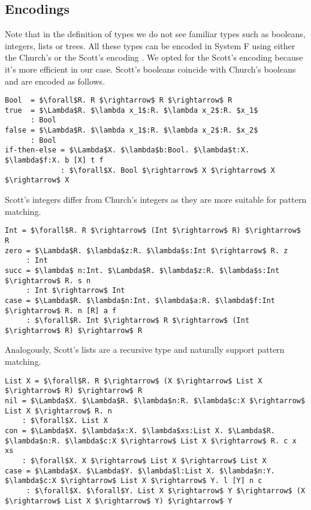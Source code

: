   \subsection{Encodings}
Note that in the definition of types we do not see familiar types such as booleans, integers, lists or trees. All these types can be encoded in System F using either the Church's or the Scott's encoding \cite{ScottNumerals}. We opted for the Scott's encoding because it's more efficient in our case.
Scott's booleans coincide with Church's booleans and are encoded as follows.
\begin{lstlisting}[style=plain, mathescape]
Bool  = $\forall$R. R $\rightarrow$ R $\rightarrow$ R
true  = $\Lambda$R. $\lambda x_1$:R. $\lambda x_2$:R. $x_1$
      : Bool
false = $\Lambda$R. $\lambda x_1$:R. $\lambda x_2$:R. $x_2$
      : Bool
if-then-else = $\Lambda$X. $\lambda$b:Bool. $\lambda$t:X. $\lambda$f:X. b [X] t f
             : $\forall$X. Bool $\rightarrow$ X $\rightarrow$ X $\rightarrow$ X
\end{lstlisting}

Scott's integers differ from Church's integers as they are more suitable for pattern matching. 
\begin{lstlisting}[style=plain, mathescape]
Int = $\forall$R. R $\rightarrow$ (Int $\rightarrow$ R) $\rightarrow$ R
zero = $\Lambda$R. $\lambda$z:R. $\lambda$s:Int $\rightarrow$ R. z
     : Int
succ = $\lambda$ n:Int. $\Lambda$R. $\lambda$z:R. $\lambda$s:Int $\rightarrow$ R. s n
     : Int $\rightarrow$ Int
case = $\Lambda$R. $\lambda$n:Int. $\lambda$a:R. $\lambda$f:Int $\rightarrow$ R. n [R] a f
     : $\forall$R. Int $\rightarrow$ R $\rightarrow$ (Int $\rightarrow$ R) $\rightarrow$ R
\end{lstlisting}

Analogously, Scott's lists are a recursive type and naturally support pattern matching.
\begin{lstlisting}[style=plain, mathescape]
List X = $\forall$R. R $\rightarrow$ (X $\rightarrow$ List X $\rightarrow$ R) $\rightarrow$ R
nil = $\Lambda$X. $\Lambda$R. $\lambda$n:R. $\lambda$c:X $\rightarrow$ List X $\rightarrow$ R. n
    : $\forall$X. List X
con = $\Lambda$X. $\lambda$x:X. $\lambda$xs:List X. $\Lambda$R. $\lambda$n:R. $\lambda$c:X $\rightarrow$ List X $\rightarrow$ R. c x xs
    : $\forall$X. X $\rightarrow$ List X $\rightarrow$ List X
case = $\Lambda$X. $\Lambda$Y. $\lambda$l:List X. $\lambda$n:Y. $\lambda$c:X $\rightarrow$ List X $\rightarrow$ Y. l [Y] n c
     : $\forall$X. $\forall$Y. List X $\rightarrow$ Y $\rightarrow$ (X $\rightarrow$ List X $\rightarrow$ Y) $\rightarrow$ Y
\end{lstlisting}

